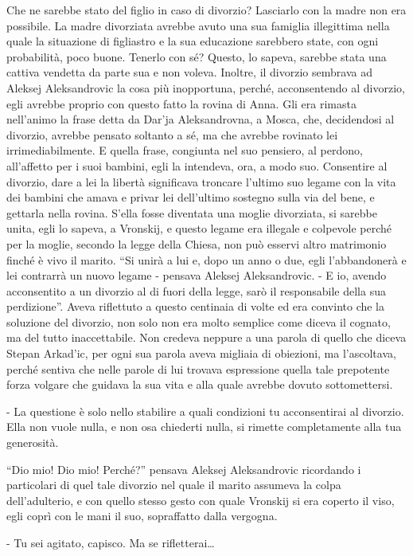 Che ne sarebbe stato del figlio in caso di divorzio? Lasciarlo con la madre non era possibile. La madre divorziata avrebbe avuto una sua famiglia illegittima nella quale la situazione di figliastro e la sua educazione sarebbero state, con ogni probabilità, poco buone. Tenerlo con sé? Questo, lo sapeva, sarebbe stata una cattiva vendetta da parte sua e non voleva. Inoltre, il divorzio sembrava ad Aleksej Aleksandrovic la cosa più inopportuna, perché, acconsentendo al divorzio, egli avrebbe proprio con questo fatto la rovina di Anna. Gli era rimasta nell'animo la frase detta da Dar'ja Aleksandrovna, a Mosca, che, decidendosi al divorzio, avrebbe pensato soltanto a sé, ma che avrebbe rovinato lei irrimediabilmente. E quella frase, congiunta nel suo pensiero, al perdono, all'affetto per i suoi bambini, egli la intendeva, ora, a modo suo. Consentire al divorzio, dare a lei la libertà significava troncare l'ultimo suo legame con la vita dei bambini che amava e privar lei dell'ultimo sostegno sulla via del bene, e gettarla nella rovina. S'ella fosse diventata una moglie divorziata, si sarebbe unita, egli lo sapeva, a Vronskij, e questo legame era illegale e colpevole perché per la moglie, secondo la legge della Chiesa, non può esservi altro matrimonio finché è vivo il marito. ``Si unirà a lui e, dopo un anno o due, egli l'abbandonerà e lei contrarrà un nuovo legame - pensava Aleksej Aleksandrovic. - E io, avendo acconsentito a un divorzio al di fuori della legge, sarò il responsabile della sua perdizione''. Aveva riflettuto a questo centinaia di volte ed era convinto che la soluzione del divorzio, non solo non era molto semplice come diceva il cognato, ma del tutto inaccettabile. Non credeva neppure a una parola di quello che diceva Stepan Arkad'ic, per ogni sua parola aveva migliaia di obiezioni, ma l'ascoltava, perché sentiva che nelle parole di lui trovava espressione quella tale prepotente forza volgare che guidava la sua vita e alla quale avrebbe dovuto sottomettersi. 

- La questione è solo nello stabilire a quali condizioni tu acconsentirai al divorzio. Ella non vuole nulla, e non osa chiederti nulla, si rimette completamente alla tua generosità. 

``Dio mio! Dio mio! Perché?'' pensava Aleksej Aleksandrovic ricordando i particolari di quel tale divorzio nel quale il marito assumeva la colpa dell'adulterio, e con quello stesso gesto con quale Vronskij si era coperto il viso, egli coprì con le mani il suo, sopraffatto dalla vergogna. 

- Tu sei agitato, capisco. Ma se rifletterai\ldots{} 


